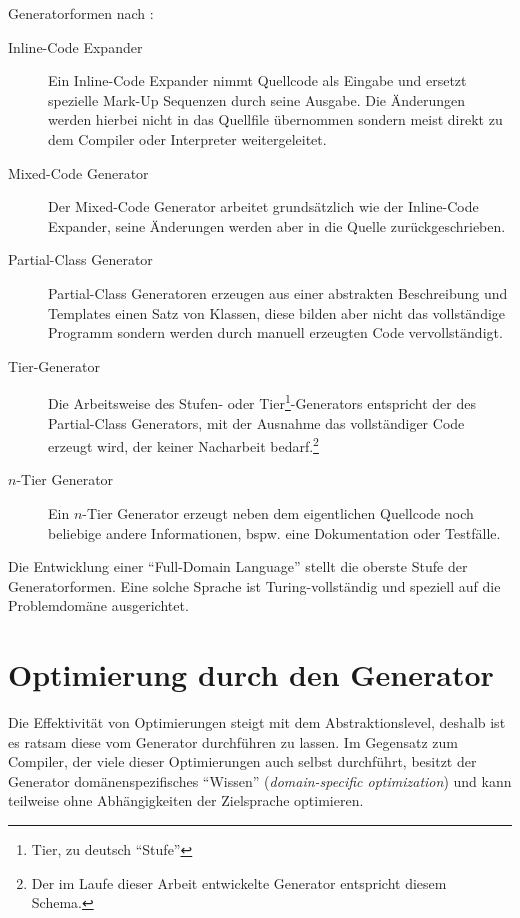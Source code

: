 Generatorformen nach \cite{herrington2003code}:
\begin{description}
    \item[Inline-Code Expander]
        Ein Inline-Code Expander nimmt Quellcode als Eingabe und ersetzt spezielle Mark-Up Sequenzen durch seine Ausgabe. Die Änderungen werden hierbei nicht in das Quellfile übernommen sondern meist direkt zu dem Compiler oder Interpreter weitergeleitet.
    \item[Mixed-Code Generator]
        Der Mixed-Code Generator arbeitet grundsätzlich wie der Inline-Code Expander, seine Änderungen werden aber in die Quelle zurückgeschrieben.
    \item[Partial-Class Generator]
        Partial-Class Generatoren erzeugen aus einer abstrakten Beschreibung und Templates einen Satz von Klassen, diese bilden aber nicht das vollständige Programm sondern werden durch manuell erzeugten Code vervollständigt. %
    \item[Tier-Generator]
        Die Arbeitsweise des Stufen- oder Tier\footnote{Tier, zu deutsch \enquote{Stufe}}-Generators entspricht der des Partial-Class Generators, mit der Ausnahme das vollständiger Code erzeugt wird, der keiner Nacharbeit bedarf.\footnote{Der im Laufe dieser Arbeit entwickelte Generator entspricht diesem Schema.}
    \item[$n$-Tier Generator] 
        Ein $n$-Tier Generator erzeugt neben dem eigentlichen Quellcode noch beliebige andere Informationen, bspw. eine Dokumentation oder Testfälle.
\end{description}

Die Entwicklung einer \enquote{Full-Domain Language} stellt die oberste Stufe der Generatorformen. Eine solche Sprache ist Turing-vollständig und speziell auf die Problemdomäne ausgerichtet.

\section{Optimierung durch den Generator}

Die Effektivität von Optimierungen steigt mit dem Abstraktionslevel, deshalb ist es ratsam diese vom Generator durchführen zu lassen. Im Gegensatz zum Compiler, der viele dieser Optimierungen auch selbst durchführt, besitzt der Generator domänenspezifisches \enquote{Wissen} (\emph{domain-specific optimization}) und kann teilweise ohne Abhängigkeiten der Zielsprache optimieren.

